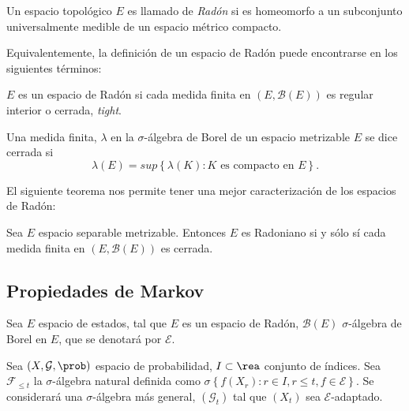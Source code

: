 \begin{Def}
Un espacio topol\'ogico $E$ es llamado de {\em Rad\'on} si es
homeomorfo a un subconjunto universalmente medible de un espacio
m\'etrico compacto.
\end{Def}

Equivalentemente, la definici\'on de un espacio de Rad\'on puede
encontrarse en los siguientes t\'erminos:

\begin{Def}
$E$ es un espacio de Rad\'on si cada medida finita en
$\left(E,\mathcal{B}\left(E\right)\right)$ es regular interior o
cerrada, {\em tight}.
\end{Def}

\begin{Def}
Una medida finita, $\lambda$ en la $\sigma$-\'algebra de Borel de
un espacio metrizable $E$ se dice cerrada si
\begin{equation}\label{Eq.A2.3}
\lambda\left(E\right)=sup\left\{\lambda\left(K\right):K\textrm{ es
compacto en }E\right\}.
\end{equation}
\end{Def}

El siguiente teorema nos permite tener una mejor caracterizaci\'on
de los espacios de Rad\'on:
\begin{Teo}\label{Tma.A2.2}
Sea $E$ espacio separable metrizable. Entonces $E$ es Radoniano si
y s\'olo s\'i cada medida finita en
$\left(E,\mathcal{B}\left(E\right)\right)$ es cerrada.
\end{Teo}

\subsection{Propiedades de Markov}

Sea $E$ espacio de estados, tal que $E$ es un espacio de Rad\'on,
$\mathcal{B}\left(E\right)$ $\sigma$-\'algebra de Borel en $E$,
que se denotar\'a por $\mathcal{E}$.

Sea $\left(X,\mathcal{G},\prob\right)$ espacio de probabilidad,
$I\subset\rea$ conjunto de índices. Sea $\mathcal{F}_{\leq
t}$ la $\sigma$-\'algebra natural definida como
$\sigma\left\{f\left(X_{r}\right):r\in I, r\leq
t,f\in\mathcal{E}\right\}$. Se considerar\'a una
$\sigma$-\'algebra m\'as general, $ \left(\mathcal{G}_{t}\right)$
tal que $\left(X_{t}\right)$ sea $\mathcal{E}$-adaptado.

